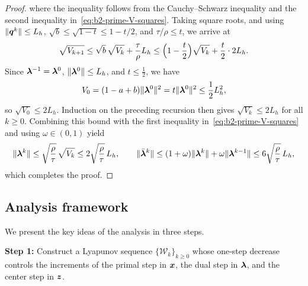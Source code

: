 \begin{proof}
where the inequality follows from the Cauchy--Schwarz inequality and the second
inequality in~\eqref{eq:b2-prime-V-squares}. Taking square roots, and using \(\|\bm{q}^k\|\le L_h\),
\(\sqrt{b}\le\sqrt{1-t}\le1-t/2\), and \(\tau/\rho\le t\), we arrive at
\[
    \sqrt{V_{k+1}}
    \le\sqrt{b}\,\sqrt{V_k}+\frac{\tau}{\rho}L_h
    \le\Bigl(1-\frac t2\Bigr)\sqrt{V_k}+\frac t2\cdot2L_h .
\]
Since \(\bm{\lambda}^{-1}=\bm{\lambda}^0\), \(\|\bm{\lambda}^0\|\le L_h\), and \(t\le\frac12\),
we have
\[
    V_0=(1-a+b)\|\bm{\lambda}^0\|^2=t\|\bm{\lambda}^0\|^2\le\frac12L_h^2,
\]
so \(\sqrt{V_0}\le 2L_h\). Induction on the preceding recursion then gives
\(\sqrt{V_k}\le 2L_h\) for all \(k\ge0\). Combining this bound with the first
inequality in~\eqref{eq:b2-prime-V-squares} and using \(\omega\in(0,1)\) yield
\[
    \|\bm{\lambda}^k\|\le\sqrt{\frac{\rho}{\tau}}\,\sqrt{V_k}
    \le 2\sqrt{\frac{\rho}{\tau}}\,L_h,
    \qquad
    \|\bar{\bm{\lambda}}^k\|\le(1+\omega)\|\bm{\lambda}^k\|+\omega\|\bm{\lambda}^{k-1}\|
    \le 6\sqrt{\frac{\rho}{\tau}}\,L_h,
\]
which completes the proof.
\end{proof}
   
\subsection{Analysis framework}
\label{subsec:fast-lralm-lyapunov}
We present the key ideas of the analysis in three steps.
\begin{stepbox}
\textbf{Step 1:} Construct a Lyapunov sequence \(\{\mathcal W_k\}_{k\ge0}\)
whose one-step decrease controls the increments of the primal step in \(\bm{x}\),
the dual step in \(\bm{\lambda}\), and the center step in \(\bm{z}\).
\end{stepbox}

